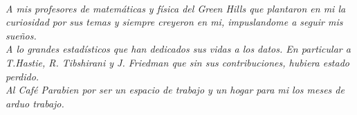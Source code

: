 \documentclass[../Main/Main.tex]{subfiles}
\begin{document}
\begin{flushright}
	\\
	\emph{A mis profesores de matemáticas y física del Green Hills que plantaron en mi la curiosidad por sus temas y siempre creyeron en mi, impuslandome a seguir mis sueños.}
	\\	
	\emph{A lo grandes estadísticos que han dedicados sus vidas a los datos. En particular a T.Hastie, R. Tibshirani y J. Friedman que sin sus contribuciones, hubiera estado perdido.} 
	\\
	\emph{Al Café Parabien por ser un espacio de trabajo y un hogar para mi los meses de arduo trabajo.}
	\null
\end{flushright}
\end{document}
